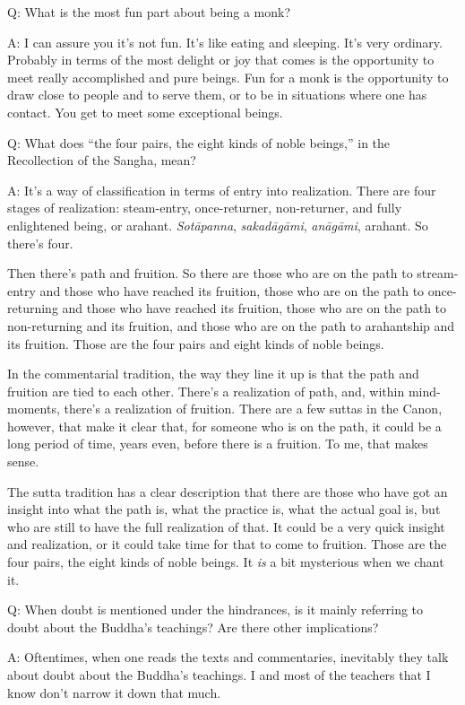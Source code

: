 \qaspace
Q: What is the most fun part about being a monk?

\qaspace
A: I can assure you it’s not fun. It’s like eating and sleeping. It’s
very ordinary. Probably in terms of the most delight or joy that comes
is the opportunity to meet really accomplished and pure beings. Fun for
a monk is the opportunity to draw close to people and to serve them, or
to be in situations where one has contact. You get to meet some
exceptional beings.

\qaspace
Q: What does “the four pairs, the eight kinds of noble beings,” in the
Recollection of the Sangha, mean?

\qaspace
A: It’s a way of classification in terms of entry into realization.
There are four stages of realization: steam-entry, once-returner,
non-returner, and fully enlightened being, or arahant. \emph{Sotāpanna},
\emph{sakadāgāmi}, \emph{anāgāmi}, arahant. So there’s four.

Then there’s path and fruition. So there are those who are on the path
to stream-entry and those who have reached its fruition, those who are
on the path to once-returning and those who have reached its fruition,
those who are on the path to non-returning and its fruition, and those
who are on the path to arahantship and its fruition. Those are the four
pairs and eight kinds of noble beings.

In the commentarial tradition, the way they line it up is that the path
and fruition are tied to each other. There’s a realization of path, and,
within mind-moments, there’s a realization of fruition. There are a few
suttas in the Canon, however, that make it clear that, for someone who
is on the path, it could be a long period of time, years even, before
there is a fruition. To me, that makes sense.

The sutta tradition has a clear description that there are those who
have got an insight into what the path is, what the practice is, what
the actual goal is, but who are still to have the full realization of
that. It could be a very quick insight and realization, or it could take
time for that to come to fruition. Those are the four pairs, the eight
kinds of noble beings. It \emph{is} a bit mysterious when we chant it.

\qaspace
Q: When doubt is mentioned under the hindrances, is it mainly referring
to doubt about the Buddha’s teachings? Are there other implications?

\qaspace
A: Oftentimes, when one reads the texts and commentaries, inevitably
they talk about doubt about the Buddha’s teachings. I and most of the
teachers that I know don’t narrow it down that much.

